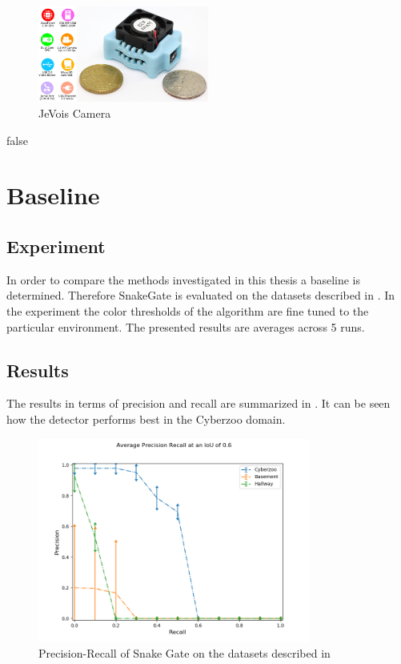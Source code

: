 \begin{figure}[hbtp]
	\centering
	\includegraphics[width=0.5\textwidth]{fig/jevois}
	\caption{JeVois Camera}
	\label{fig:jevois}
\end{figure}



\if false
\section{Baseline}


\subsection{Experiment}

In order to compare the methods investigated in this thesis a baseline is determined. Therefore SnakeGate is evaluated on the datasets described in . In the experiment the color thresholds of the algorithm are fine tuned to the particular environment. The presented results are averages across 5 runs.


\subsection{Results}

The results in terms of precision and recall are summarized in . It can be seen how the detector performs best in the Cyberzoo domain.

\begin{figure}
	\includegraphics[width=0.8\textwidth]{fig/snake_results_real}
	\caption{Precision-Recall of Snake Gate on the datasets described in }
	\label{fig:snake_results_real}
\end{figure}

\fi